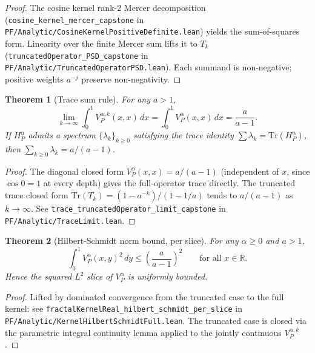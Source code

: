 \documentclass[11pt,a4paper,reqno]{amsart}
\theoremstyle{plain}
\newtheorem{theorem}{Theorem}[section]
\theoremstyle{definition}
\theoremstyle{remark}
\newcommand{\code}[1]{\texttt{#1}}
\newcommand{\HP}{H_{P}}
\newcommand{\VP}{V_{P}}
\begin{document}
\begin{proof}
The cosine kernel rank-2 Mercer decomposition
(\code{cosine\_kernel\_mercer\_capstone} in
\code{PF/Analytic/CosineKernelPositiveDefinite.lean}) yields the
sum-of-squares form. Linearity over the finite Mercer sum lifts it to
$T_{k}$ (\code{truncatedOperator\_PSD\_capstone} in
\code{PF/Analytic/TruncatedOperatorPSD.lean}). Each summand is
non-negative; positive weights $a^{-j}$ preserve non-negativity.
\end{proof}

\begin{theorem}[Trace sum rule]
\label{thm:trace-sum}
For any $a > 1$,
\begin{equation}
\label{eq:trace-sum}
\lim_{k \to \infty} \int_{0}^{1} \VP^{\alpha,k}(x, x) \, dx
= \int_{0}^{1} \VP^{\alpha}(x, x) \, dx = \frac{a}{a - 1}.
\end{equation}
If $\HP^{\alpha}$ admits a spectrum
$\{\lambda_{k}\}_{k \ge 0}$ satisfying the trace identity
$\sum \lambda_{k} = \mathrm{Tr}(\HP^{\alpha})$, then
$\sum_{k \ge 0} \lambda_{k} = a/(a - 1)$.
\end{theorem}

\begin{proof}
The diagonal closed form $\VP^{\alpha}(x, x) = a/(a-1)$ (independent
of $x$, since $\cos 0 = 1$ at every depth) gives the full-operator
trace directly. The truncated trace closed form
$\mathrm{Tr}(T_{k}) = (1 - a^{-k})/(1 - 1/a)$ tends to $a/(a-1)$ as
$k \to \infty$. See
\code{trace\_truncatedOperator\_limit\_capstone} in
\code{PF/Analytic/TraceLimit.lean}.
\end{proof}

\begin{theorem}[Hilbert-Schmidt norm bound, per slice]
\label{thm:hs-norm}
For any $\alpha \ge 0$ and $a > 1$,
\begin{equation}
\label{eq:hs-norm}
\int_{0}^{1} \VP^{\alpha}(x, y)^{2} \, dy \le \left(\frac{a}{a-1}\right)^{2}
\qquad \text{for all } x \in \mathbb{R}.
\end{equation}
Hence the squared $L^{2}$ slice of $\VP^{\alpha}$ is uniformly bounded.
\end{theorem}

\begin{proof}
Lifted by dominated convergence from the truncated case to the full
kernel: see
\code{fractalKernelReal\_hilbert\_schmidt\_per\_slice} in
\code{PF/Analytic/KernelHilbertSchmidtFull.lean}.
The truncated case is closed via the parametric integral continuity
lemma applied to the jointly continuous $\VP^{\alpha,k}$.
\end{proof}
\end{document}

